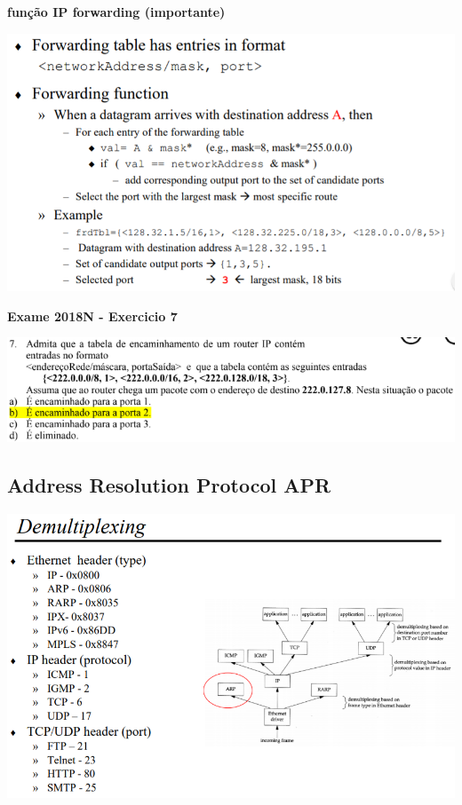 \documentclass[../resumosRCOM.tex]{subfiles}
\begin{document}
\textbf{função IP forwarding (importante)}
\begin{center}
    \includegraphics[width=15cm]{images/RCOM22.png}
\end{center}
\textbf{Exame 2018N - Exercicio 7}
\begin{center}
    \includegraphics[width=15cm]{images/RCOM45.png}
\end{center}

\subsection{Address Resolution Protocol APR}
\begin{center}
    \includegraphics[width=14cm]{images/RCOM23.png}
\end{center}
\end{document}
